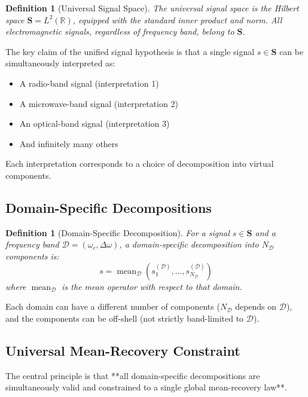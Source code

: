 \documentclass[twocolumn,11pt,a4paper]{article}
\newtheorem{definition}[theorem]{Definition}
\newcommand{\signal}{s}
\newcommand{\Signal}{\mathbf{S}}
\newcommand{\bandwidth}{\Delta\omega}
\newcommand{\domain}{\mathcal{D}}
\newcommand{\mean}{\operatorname{mean}}
\newcommand{\freq}{\omega}
\begin{document}
\begin{definition}[Universal Signal Space]
The \emph{universal signal space} is the Hilbert space $\Signal = L^2(\mathbb{R})$, equipped with the standard inner product and norm. All electromagnetic signals, regardless of frequency band, belong to $\Signal$.
\end{definition}

The key claim of the unified signal hypothesis is that a single signal $\signal \in \Signal$ can be simultaneously interpreted as:
\begin{itemize}[nosep]
  \item A radio-band signal (interpretation 1)
  \item A microwave-band signal (interpretation 2)
  \item An optical-band signal (interpretation 3)
  \item And infinitely many others
\end{itemize}

Each interpretation corresponds to a choice of decomposition into virtual components.

\subsection{Domain-Specific Decompositions}

\begin{definition}[Domain-Specific Decomposition]
For a signal $\signal \in \Signal$ and a frequency band $\domain = (\freq_c, \bandwidth)$, a \emph{domain-specific decomposition} into $N_\domain$ components is:
\begin{equation}
  \signal = \mean_\domain(\signal_1^{(\domain)}, \ldots, \signal_{N_\domain}^{(\domain)})
\end{equation}
where $\mean_\domain$ is the mean operator with respect to that domain.
\end{definition}

Each domain can have a different number of components ($N_\domain$ depends on $\domain$), and the components can be off-shell (not strictly band-limited to $\domain$).

\subsection{Universal Mean-Recovery Constraint}

The central principle is that **all domain-specific decompositions are simultaneously valid and constrained to a single global mean-recovery law**.
\end{document}
